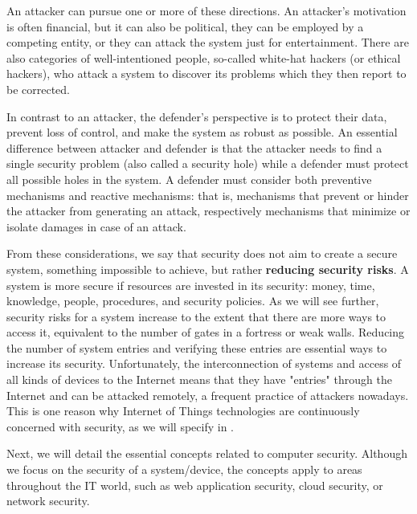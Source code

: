 An attacker can pursue one or more of these directions.
An attacker's motivation is often financial, but it can also be political, they can be employed by a competing entity, or they can attack the system just for entertainment.
There are also categories of well-intentioned people, so-called white-hat hackers (or ethical hackers), who attack a system to discover its problems which they then report to be corrected.

In contrast to an attacker, the defender's perspective is to protect their data, prevent loss of control, and make the system as robust as possible.
An essential difference between attacker and defender is that the attacker needs to find a single security problem (also called a security hole) while a defender must protect all possible holes in the system.
A defender must consider both preventive mechanisms and reactive mechanisms: that is, mechanisms that prevent or hinder the attacker from generating an attack, respectively mechanisms that minimize or isolate damages in case of an attack.

From these considerations, we say that security does not aim to create a secure system, something impossible to achieve, but rather \textbf{reducing security risks}.
A system is more secure if resources are invested in its security: money, time, knowledge, people, procedures, and security policies.
As we will see further, security risks for a system increase to the extent that there are more ways to access it, equivalent to the number of gates in a fortress or weak walls.
Reducing the number of system entries and verifying these entries are essential ways to increase its security.
Unfortunately, the interconnection of systems and access of all kinds of devices to the Internet means that they have "entries" through the Internet and can be attacked remotely, a frequent practice of attackers nowadays.
This is one reason why Internet of Things technologies are continuously concerned with security, as we will specify in .

Next, we will detail the essential concepts related to computer security.
Although we focus on the security of a system/device, the concepts apply to areas throughout the IT world, such as web application security, cloud security, or network security. 